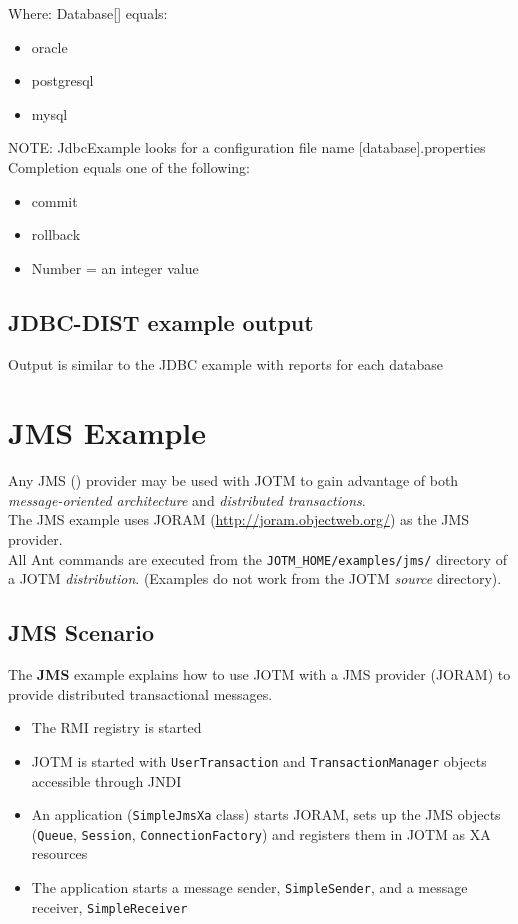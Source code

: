 \documentclass[a4paper,11pt]{article}
\begin{document}
Where:
Database[] equals:
\begin{itemize}
\item oracle
\item postgresql 
\item mysql 
\end{itemize}
NOTE: JdbcExample looks for a configuration file name [database].properties
Completion equals one of the following:
\begin{itemize}
\item commit
\item rollback

\item Number = an integer value
\end{itemize}

\subsection{JDBC-DIST example output}
Output is similar to the JDBC example with reports for each database\\


\section{JMS Example}
\label{sec:jms_example}

Any JMS ()
 provider may be used with JOTM to gain advantage of both 
\emph{message-oriented architecture} and \emph{distributed transactions}.\\
The JMS example uses JORAM (\url{http://joram.objectweb.org/}) as the
JMS provider.\\

\noindent All Ant commands are executed from the \texttt{JOTM\_HOME/examples/jms/}
directory of a JOTM \emph{distribution}. (Examples do not work from the JOTM
\emph{source} directory).

\subsection{JMS Scenario}
\label{sec:jms_scenario}
The \textbf{JMS} example explains how to use JOTM with a JMS provider (JORAM)
 to provide distributed transactional messages.

\begin{itemize}
\item The RMI registry is started
\item JOTM is started with \texttt{UserTransaction} and
  \texttt{TransactionManager} objects accessible through JNDI
\item An application (\texttt{SimpleJmsXa} class) starts JORAM, sets up
  the JMS objects (\texttt{Queue}, \texttt{Session},
  \texttt{ConnectionFactory}) and registers them in JOTM as XA
  resources
\item  The application starts a message sender, 
  \texttt{SimpleSender}, and a message receiver, \texttt{SimpleReceiver}
\end{itemize}
\end{document}

